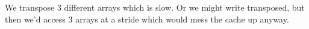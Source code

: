 We transpose 3 different arrays which is slow. Or we might write transposed, but then we'd access 3 arrays at a stride which would mess the cache up anyway.

%
%
%
%
